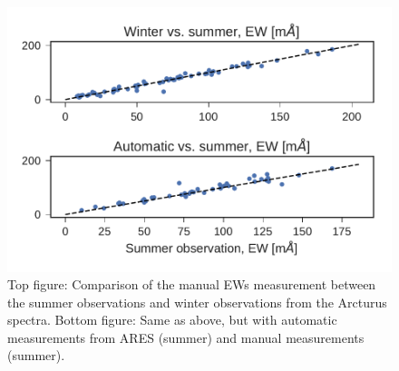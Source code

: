 \documentclass{aa}
\begin{document}
\begin{figure}[htpb!]
    \centering
    \includegraphics[width=1.0\linewidth]{figures/EWcomp.pdf}
    \caption{Top figure: Comparison of the manual EWs measurement between the
             summer observations and winter observations from the Arcturus
             spectra. Bottom figure: Same as above, but with automatic
             measurements from ARES (summer) and manual measurements (summer).}
    \label{fig:EWcomp}
\end{figure}
\end{document}
